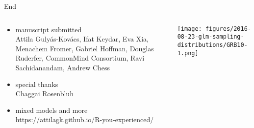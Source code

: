 \documentclass[usenames,dvipsnames]{beamer} %
\begin{document}
\begin{frame}{End}
\begin{columns}[t]
\begin{column}{0.5\textwidth}
\begin{itemize}
\item manuscript submitted \\
{\footnotesize
Attila Guly\'{a}s-Kov\'{a}cs, Ifat Keydar,
Eva Xia, Menachem Fromer, Gabriel Hoffman, Douglas Ruderfer,
CommonMind Consortium, Ravi Sachidanandam,
Andrew Chess
}
\item special thanks \\
{\footnotesize Chaggai Rosenbluh}
\item mixed models and more \\
{\footnotesize
https://attilagk.github.io/R-you-experienced/ 
}
\end{itemize}
\end{column}

\begin{column}{0.5\textwidth}

\texttt{[image: figures/2016-08-23-glm-sampling-distributions/GRB10-1.png]}
\end{column}
\end{columns}
\end{frame}
\end{document}

